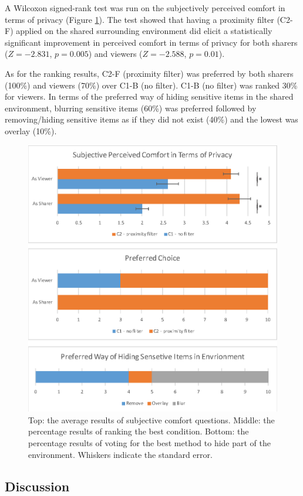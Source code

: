 A Wilcoxon signed-rank test was run on the subjectively perceived comfort in terms of privacy (Figure \ref{fig:environment:results}). The test showed that having a proximity filter (C2-F) applied on the shared surrounding environment did elicit a statistically significant improvement in perceived comfort in terms of privacy for both sharers ($Z=-2.831$, $p=0.005$) and viewers ($Z=-2.588$, $p=0.01$). 

As for the ranking results, C2-F (proximity filter) was preferred by both sharers (100\%) and viewers (70\%) over C1-B (no filter). C1-B (no filter) was ranked 30\% for viewers. In terms of the preferred way of hiding sensitive items in the shared environment, blurring sensitive items (60\%) was preferred followed by removing/hiding sensitive items as if they did not exist (40\%) and the lowest was overlay (10\%). 

\begin{figure}[ht]
  \centering
  \includegraphics[width=.8\linewidth]{images/53-environment-ismar18/images-04.eps}
  \caption{Top: the average results of subjective comfort questions. Middle: the percentage results of ranking the best condition. Bottom: the percentage results of voting for the best method to hide part of the environment. Whiskers indicate the standard error.}
  \label{fig:environment:results}
\end{figure}

\subsection{Discussion}

